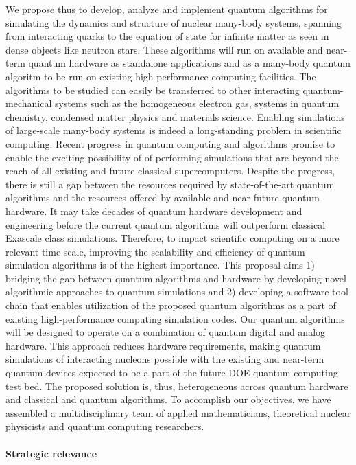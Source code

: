 \documentclass[10pt]{article}
\begin{document}
We propose thus to develop, analyze and implement quantum algorithms for simulating the dynamics and structure of nuclear many-body systems, spanning from interacting quarks to the equation of state for infinite matter as seen in dense objects like neutron stars. These algorithms will run on available and near-term quantum hardware as standalone applications and as a many-body quantum algoritm to be run on existing high-performance computing facilities. The algorithms to be studied can easily be transferred to other interacting quantum-mechanical systems such as the homogeneous electron gas, systems in quantum chemistry, condensed matter physics and materials science.  
Enabling simulations of large-scale many-body systems is indeed a long-standing problem in scientific computing. Recent progress in quantum computing and algorithms promise to enable the exciting possibility of of performing simulations that are beyond the reach of all existing and future classical supercomputers. Despite the progress, there is still a gap between the
resources required by state-of-the-art quantum algorithms and the resources offered by available and near-future
quantum hardware. It may take decades of quantum hardware development and engineering before
the current quantum algorithms will outperform classical Exascale class simulations. Therefore, to impact
scientific computing on a more relevant time scale, improving the scalability and efficiency of
quantum simulation algorithms is of the highest importance. This proposal aims 1) bridging
the gap between quantum algorithms  and hardware by developing novel algorithmic approaches to quantum
simulations and 2) developing a software tool chain that enables utilization of the proposed quantum algorithms as a
part of  existing high-performance computing simulation codes. Our quantum algorithms will be  designed to operate on a combination of quantum digital and analog
hardware. This approach reduces hardware requirements, making quantum simulations of interacting
nucleons possible with the existing and near-term quantum devices expected to be a part of
the future DOE quantum computing test bed. The proposed solution is, thus, heterogeneous across
quantum hardware and classical and quantum algorithms.
To accomplish our objectives, we have assembled a multidisciplinary team of 
applied mathematicians, theoretical nuclear physicists  and quantum computing
researchers.


\paragraph{Strategic relevance}
\end{document}
